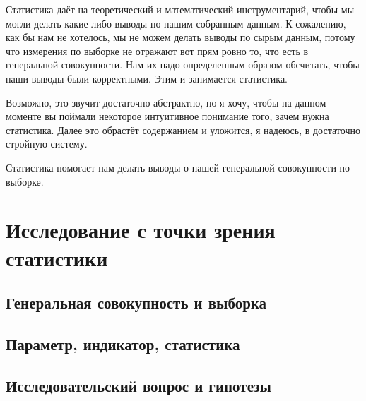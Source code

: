 \documentclass[
  letterpaper,
  DIV=11,
  numbers=noendperiod]{scrreprt}
\theoremstyle{definition}
\theoremstyle{remark}
\begin{document}
Статистика даёт на теоретический и математический инструментарий, чтобы
мы могли делать какие-либо выводы по нашим собранным данным. К
сожалению, как бы нам не хотелось, мы не можем делать выводы по сырым
данным, потому что измерения по выборке не отражают вот прям ровно то,
что есть в генеральной совокупности. Нам их надо определенным образом
обсчитать, чтобы наши выводы были корректными. Этим и занимается
статистика.

Возможно, это звучит достаточно абстрактно, но я хочу, чтобы на данном
моменте вы поймали некоторое интуитивное понимание того, зачем нужна
статистика. Далее это обрастёт содержанием и уложится, я надеюсь, в
достаточно стройную систему.

\begin{tcolorbox}[enhanced jigsaw, opacitybacktitle=0.6, breakable, colbacktitle=quarto-callout-warning-color!10!white, colback=white, coltitle=black, rightrule=.15mm, bottomtitle=1mm, colframe=quarto-callout-warning-color-frame, toptitle=1mm, titlerule=0mm, leftrule=.75mm, arc=.35mm, bottomrule=.15mm, toprule=.15mm, title=\textcolor{quarto-callout-warning-color}{\faExclamationTriangle}\hspace{0.5em}{Важно}, left=2mm, opacityback=0]

Статистика помогает нам делать выводы о нашей генеральной совокупности
по выборке.

\end{tcolorbox}

\section{Исследование с точки зрения статистики}\label{stats-research}

\subsection{Генеральная совокупность и
выборка}\label{stats-population-sample}

\subsection{Параметр, индикатор, статистика}\label{stats-parameters}

\subsection{Исследовательский вопрос и гипотезы}\label{stats-hypotheses}
\end{document}
